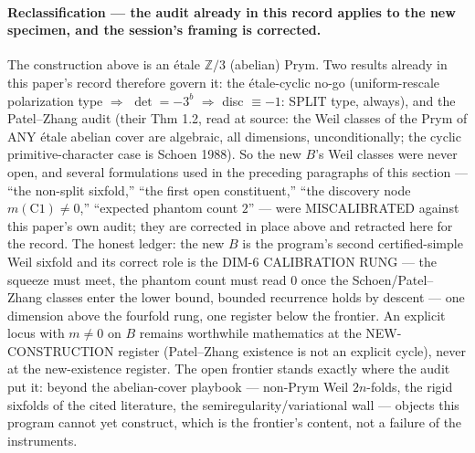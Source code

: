 \documentclass[11pt]{article}
\theoremstyle{definition}
\theoremstyle{remark}
\begin{document}
\paragraph{Reclassification --- the audit already in this record
applies to the new specimen, and the session's framing is corrected.}
The construction above is an \'etale $\mathbb{Z}/3$ (abelian) Prym.
Two results already in this paper's record therefore govern it:
the \'etale-cyclic no-go (uniform-rescale polarization type
$\Rightarrow$ $\det=-3^b$ $\Rightarrow$ disc $\equiv-1$: SPLIT type,
always), and the Patel--Zhang audit (their Thm 1.2, read at source:
the Weil classes of the Prym of ANY \'etale abelian cover are
algebraic, all dimensions, unconditionally; the cyclic
primitive-character case is Schoen 1988).  So the new $B$'s Weil
classes were never open, and several formulations used in the
preceding paragraphs of this section --- ``the non-split sixfold,''
``the first open constituent,'' ``the discovery node $m(\mathrm{C1})
\neq0$,'' ``expected phantom count $2$'' --- were MISCALIBRATED
against this paper's own audit; they are corrected in place above and
retracted here for the record.  The honest ledger: the new $B$ is the
program's second certified-simple Weil sixfold and its correct role
is the DIM-6 CALIBRATION RUNG --- the squeeze must meet, the phantom
count must read $0$ once the Schoen/Patel--Zhang classes enter the
lower bound, bounded recurrence holds by descent --- one dimension
above the fourfold rung, one register below the frontier.  An
explicit locus with $m\neq0$ on $B$ remains worthwhile mathematics at
the NEW-CONSTRUCTION register (Patel--Zhang existence is not an
explicit cycle), never at the new-existence register.  The open
frontier stands exactly where the audit put it: beyond the
abelian-cover playbook --- non-Prym Weil $2n$-folds, the rigid
sixfolds of the cited literature, the semiregularity/variational
wall --- objects this program cannot yet construct, which is the
frontier's content, not a failure of the instruments.
\end{document}
